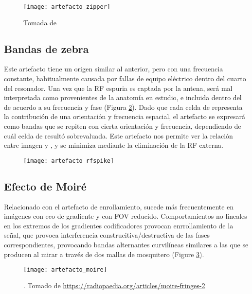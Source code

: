 \begin{figure}[htb]
 \begin{figg}
   \texttt{[image: artefacto\_zipper]}
   \caption{\figurapendiente  Tomada de \cite{ogbole2017brain}}
 \label{fig:artefacto_zipper}
 \end{figg}
\end{figure}



\subsection{Bandas de zebra}
Este artefacto tiene un origen similar al anterior, pero con una frecuencia constante, habitualmente causada por fallas de equipo eléctrico dentro del cuarto del resonador. Una vez que la RF espuria es captada por la antena, será mal interpretada como provenientes de la anatomía en estudio, e incluida dentro del \espaciok de acuerdo a su frecuencia y fase (Figura \ref{fig:artefacto_rfspike}).  Dado que cada celda de \espaciok representa la contribución de una orientación y frecuencia espacial, el artefacto se expresará como bandas que se repiten con cierta orientación y frecuencia, dependiendo de cuál celda de \espaciok resultó sobrevaluada. Este artefacto nos permite ver la relación entre imagen y \espaciok, y se minimiza mediante la eliminación de la RF externa.

\begin{figure}[htb]
 \begin{figg}
   \texttt{[image: artefacto\_rfspike]}
   \caption{\figurapendiente}
 \label{fig:artefacto_rfspike}
 \end{figg}
\end{figure}
 



\subsection{Efecto de Moiré}
Relacionado con el artefacto de enrollamiento, sucede más frecuentemente en imágenes con eco de gradiente y con FOV reducido. Comportamientos no lineales en los extremos de los gradientes codificadores provocan enrrollamiento de la señal, que provoca interferencia construcitiva/destructiva de las fases correspondientes, provocando bandas alternantes curvilíneas similares a las que se producen al mirar a través de dos mallas de mosquitero (Figure \ref{fig:artefacto_moire}). 


\begin{figure}[htb]
 \begin{figg}
   \texttt{[image: artefacto\_moire]}
   \caption{\figurapendiente. Tomado de \url{https://radiopaedia.org/articles/moire-fringes-2}}
 \label{fig:artefacto_moire}
 \end{figg}
\end{figure}


